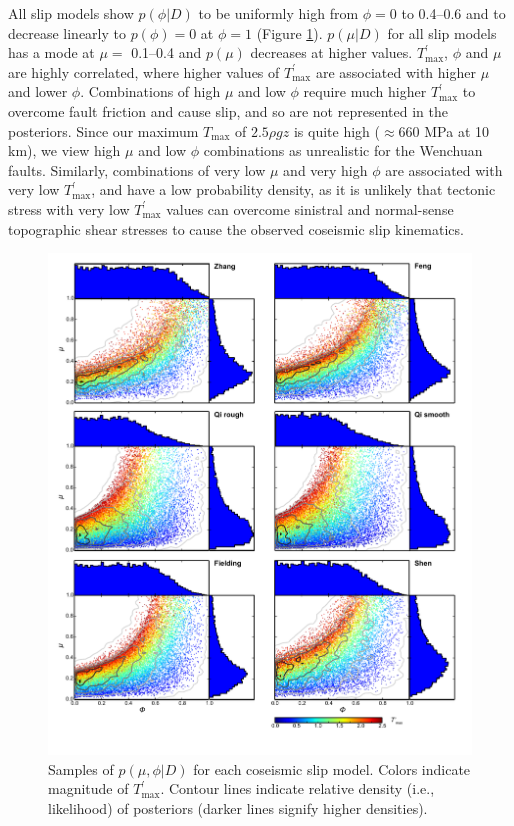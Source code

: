 \documentclass[twocolumn,jgrga]{AGUTeX}
\begin{document}
\begin{article}
All slip models show $p(\phi | D)$ to be uniformly high from $\phi = 0$
to 0.4--0.6 and to decrease linearly to $p(\phi) = 0$ at $\phi = 1$
(Figure \ref{fig:mu_phi_scatters}). $p(\mu | D)$ for all slip models has
a mode at $\mu =$ 0.1--0.4 and $p(\mu)$ decreases at higher values.
$T^\prime_{\mathrm{max}}$, $\phi$ and $\mu$ are highly correlated, where
higher values of $T^\prime_{\mathrm{max}}$ are associated with higher
$\mu$ and lower $\phi$. Combinations of high $\mu$ and low $\phi$
require much higher $T^\prime_{\mathrm{max}}$ to overcome fault friction
and cause slip, and so are not represented in the posteriors. Since our
maximum $T_{\mathrm{max}}$ of $2.5 \rho g z$ is quite high
($\approx 660$ MPa at 10 km), we view high $\mu$ and low $\phi$
combinations as unrealistic for the Wenchuan faults. Similarly,
combinations of very low $\mu$ and very high $\phi$ are associated with
very low $T^\prime_{\mathrm{max}}$, and have a low probability density,
as it is unlikely that tectonic stress with very low $T^\prime_{\mathrm{max}}$
values can
overcome sinistral and normal-sense topographic shear stresses to cause
the observed coseismic slip kinematics.

\begin{figure}[htbp]
\centering
\includegraphics[width=40pc]{../figures/mu_phi_fms.pdf}
\caption{Samples of $p(\mu,\phi | D)$ for each coseismic slip model.
Colors indicate magnitude of $T^\prime_{\mathrm{max}}$. Contour lines
indicate relative density (i.e., likelihood) of posteriors (darker lines
signify higher densities).}
\label{fig:mu_phi_scatters}
\end{figure}


\end{article}
\end{document}
